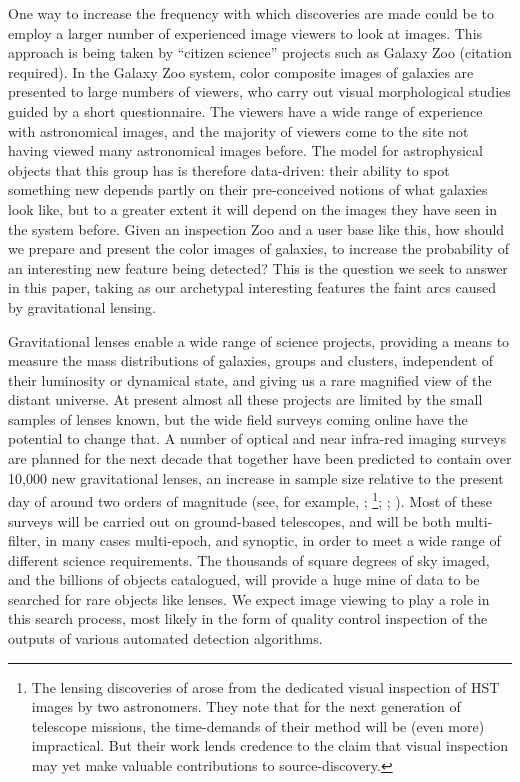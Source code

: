 \documentclass[letterpaper, 11pt]{article}
\def\HST{HST\xspace}
\begin{document}
One way to increase the frequency with which discoveries are made  could be to
employ a larger number of experienced image viewers to look at images.  This
approach is being taken by ``citizen science'' projects such as Galaxy Zoo
(citation required). In the Galaxy Zoo system, color composite
images of galaxies are presented to large numbers of viewers, who carry out
visual morphological studies guided by a short questionnaire. The viewers have
a wide range of experience with astronomical images, and the majority of
viewers come to the site not having viewed many astronomical images before.
The model for astrophysical objects that this group has is therefore
data-driven: their ability to spot something new depends partly on their
pre-conceived notions of what galaxies look like, but to a greater extent it
will depend on the images they have seen in the system before. Given an
inspection Zoo and a user base like this,  how should we prepare and present
the color images of galaxies, to increase the probability of an interesting
new feature being detected? This is the question we seek to answer in this
paper, taking as our archetypal interesting features the faint arcs caused by
gravitational lensing. 

Gravitational lenses enable a wide range of science projects, providing a
means to measure the mass distributions of  galaxies, groups and clusters,
independent of their luminosity or dynamical state, and giving us a rare
magnified view of the distant universe. At present almost all these projects
are limited by the small samples of lenses known, but the wide field surveys
coming online have the potential to change that. A number of optical and near
infra-red imaging surveys are planned for the next decade that together have
been predicted to contain over 10,000 new gravitational lenses, an increase in
sample size relative to the present day of around two orders of magnitude
(see, for example, \citet{O+M10}; \citet{Paw++12}\footnote{The lensing discoveries of \citet{Paw++12} arose from the dedicated visual inspection of \HST images by two astronomers. They note that for the next generation of telescope missions, the time-demands of their method will be (even more) impractical. But their work lends credence to the claim that visual inspection may yet make valuable contributions to source-discovery.}; \citet[chapter 12]{LSST09}; \citet[chapter 1, page 8]{ERB10}). Most of these
surveys will be carried out on ground-based telescopes, and will be both
multi-filter, in many cases multi-epoch, and synoptic, in order to meet a wide
range of different science requirements. The thousands of square degrees of
sky imaged, and the billions of objects catalogued, will provide a huge mine
of data to be searched for rare objects like lenses. We expect image viewing
to play a role in this search process, most likely in the form of quality
control inspection of the outputs of various automated detection algorithms.
\end{document}
